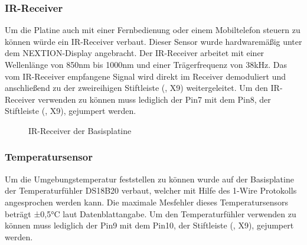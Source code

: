 \subsubsection{IR-Receiver}
Um die Platine auch mit einer Fernbedienung oder einem Mobiltelefon steuern zu können würde ein IR-Receiver verbaut. Dieser Sensor wurde hardwaremäßig unter dem NEXTION-Display angebracht. Der IR-Receiver arbeitet mit einer Wellenlänge von 850nm bis 1000nm und einer Trägerfrequenz von 38kHz. Das vom IR-Receiver empfangene Signal wird direkt im Receiver demoduliert und anschließend zu der zweireihigen Stiftleiste (, X9) weitergeleitet. Um den IR-Receiver verwenden zu können muss lediglich der Pin7 mit dem Pin8, der Stiftleiste (, X9), gejumpert werden.

\begin{figure}[htb]
    \centering
    \qquad
    \qquad
    \caption[IR-Receiver der Basisplatine]{IR-Receiver der \gls{Basisplatine}}
    \label{fig:basisplatine-ir}
\end{figure}

\subsubsection{Temperatursensor}
Um die Umgebungstemperatur feststellen zu können wurde auf der Basisplatine der Temperaturfühler DS18B20 verbaut, welcher mit Hilfe des 1-Wire Protokolls angesprochen werden kann. Die maximale Mesfehler dieses Temperatursensors beträgt ±0,5°C laut Datenblattangabe. Um den Temperaturfühler verwenden zu können muss lediglich der Pin9 mit dem Pin10, der Stiftleiste (, X9), gejumpert werden. 

